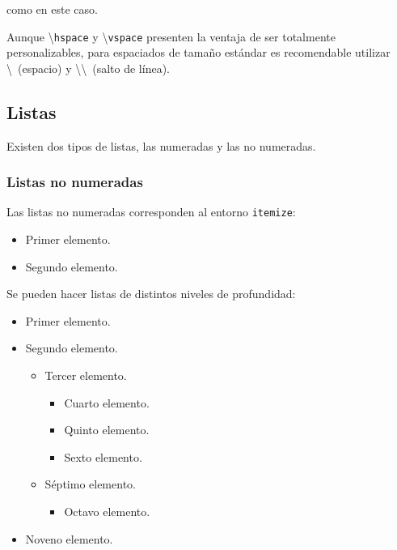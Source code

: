\documentclass[a4paper, 11pt, spanish, twoside]{article}
\begin{document}
\vspace{6cm}

como en este caso.

Aunque \textbackslash\texttt{hspace} y \textbackslash\texttt{vspace} presenten la ventaja de ser totalmente personalizables, para espaciados de tamaño estándar es recomendable utilizar \textbackslash \ (espacio) y \textbackslash\textbackslash \ (salto de línea).


\subsection{Listas}

Existen dos tipos de listas, las numeradas y las no numeradas.


\subsubsection{Listas no numeradas}

Las listas no numeradas corresponden al entorno \texttt{itemize}:

\begin{itemize}
    \item Primer elemento.
    \item Segundo elemento.
\end{itemize}

Se pueden hacer listas de distintos niveles de profundidad:

\begin{itemize}
    \item Primer elemento.
    \item Segundo elemento.
    \begin{itemize}
        \item Tercer elemento.
        \begin{itemize}
            \item Cuarto elemento.
            \item Quinto elemento.
        \item Sexto elemento.
        \end{itemize}
        \item Séptimo elemento.
        \begin{itemize}
            \item Octavo elemento.
        \end{itemize}
    \end{itemize}
    \item Noveno elemento.
\end{itemize}
\end{document}
